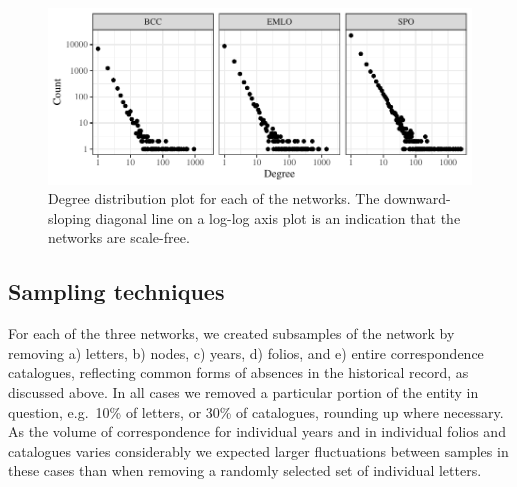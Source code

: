 \documentclass[]{article}
\begin{document}
\begin{figure}
\centering
\includegraphics{network_robustness_article_anon_files/figure-latex/degreeDist-1.pdf}
\caption{\label{fig:degreeDist}Degree distribution plot for each of the networks. The downward-sloping diagonal line on a log-log axis plot is an indication that the networks are scale-free.}
\end{figure}

\hypertarget{sampling-techniques}{%
\subsection{Sampling techniques}\label{sampling-techniques}}

For each of the three networks, we created subsamples of the network by removing a) letters, b) nodes, c) years, d) folios, and e) entire correspondence catalogues, reflecting common forms of absences in the historical record, as discussed above. In all cases we removed a particular portion of the entity in question, e.g.~10\% of letters, or 30\% of catalogues, rounding up where necessary. As the volume of correspondence for individual years and in individual folios and catalogues varies considerably we expected larger fluctuations between samples in these cases than when removing a randomly selected set of individual letters.
\end{document}
